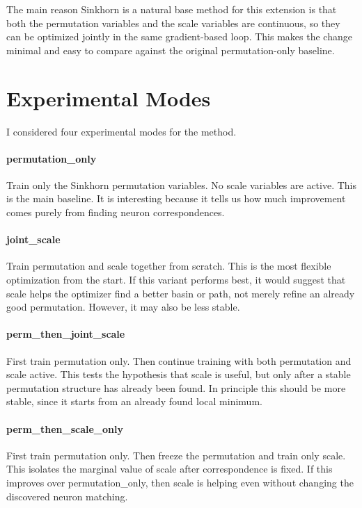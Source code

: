 \documentclass[11pt,a4paper]{article}
\begin{document}
The main reason Sinkhorn is a natural base method for this extension is that both the permutation variables and the scale variables are continuous, so they can be optimized jointly in the same gradient-based loop. This makes the change minimal and easy to compare against the original permutation-only baseline.

\section{Experimental Modes}

I considered four experimental modes for the method.

\paragraph{permutation\_only}
Train only the Sinkhorn permutation variables. No scale variables are active. This is the main baseline. It is interesting because it tells us how much improvement comes purely from finding neuron correspondences.

\paragraph{joint\_scale}
Train permutation and scale together from scratch. This is the most flexible optimization from the start. If this variant performs best, it would suggest that scale helps the optimizer find a better basin or path, not merely refine an already good permutation. However, it may also be less stable.

\paragraph{perm\_then\_joint\_scale}
First train permutation only. Then continue training with both permutation and scale active. This tests the hypothesis that scale is useful, but only after a stable permutation structure has already been found. In principle this should be more stable, since it starts from an already found local minimum.

\paragraph{perm\_then\_scale\_only}
First train permutation only. Then freeze the permutation and train only scale. This isolates the marginal value of scale after correspondence is fixed. If this improves over permutation\_only, then scale is helping even without changing the discovered neuron matching.
\end{document}
